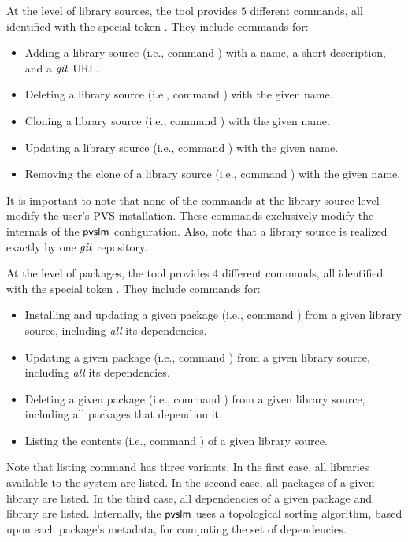 At the level of library sources, the tool provides $5$ different
commands, all identified with the special token . They
include commands for:

\begin{itemize}
  \item Adding a library source (i.e., command ) with a
    name, a short description, and a $\textit{git}$ URL.
  \item Deleting a library source (i.e., command ) with
    the given name.
  \item Cloning a library source (i.e., command ) with the
    given name.
  \item Updating a library source (i.e., command ) with
    the given name.
  \item Removing the clone of a library source (i.e., command
    ) with the given name.
\end{itemize}

It is important to note that none of the commands at the library
source level modify the user's PVS installation. These commands
exclusively modify the internals of the $\textsf{pvslm}$ configuration. Also,
note that a library source is realized exactly by one $\textit{git}$
repository.

At the level of packages, the tool provides $4$ different
commands, all identified with the special token . They
include commands for:

\begin{itemize}
  \item Installing and updating a given package (i.e., command
    ) from a given library source, including {\em all} its
    dependencies.
  \item Updating a given package (i.e., command ) from a given
    library source, including {\em all} its dependencies.
  \item Deleting a given package (i.e., command ) from a given
    library source, including all packages that depend on it.
  \item Listing the contents (i.e., command ) of a given
    library source.
\end{itemize}

Note that listing command has three variants. In the first case, all
libraries available to the system are listed. In the second case, all
packages of a given library are listed. In the third case, all
dependencies of a given package and library are listed. Internally,
the $\textsf{pvslm}$ uses a topological sorting algorithm, based upon each
package's metadata, for computing the set of dependencies.
